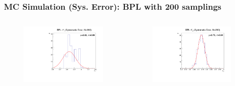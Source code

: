 \documentclass{beamer}
\begin{document}
\begin{frame}
  \frametitle{MC Simulation (Sys. Error): BPL with 200 samplings}
  \begin{columns}
    \begin{figure}[h!]
      \includegraphics[height=\textwidth]{figure/monte_carlo/N200/BPLwHe_gamma1_sys.pdf}
    \end{figure}
  
    \begin{figure}[h!]
      \includegraphics[height=\textwidth]{figure/monte_carlo/N200/BPLwHe_gamma2_sys.pdf}
    \end{figure}


\end{columns}
\end{frame}
\end{document}
